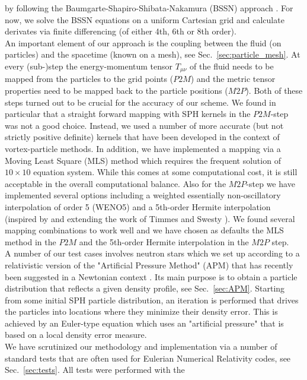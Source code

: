 \documentclass[useAMS,usenatbib]{iopart}
\begin{document}
by following the Baumgarte-Shapiro-Shibata-Nakamura (BSSN) approach  \cite{nakamura87,shibata95,baumgarte99}. 
For now, we solve the BSSN equations on a uniform Cartesian grid and calculate derivates 
via finite differencing (of either 4th, 6th or 8th order). \\
An important element of our approach is the coupling between the fluid (on particles) and
the spacetime (known on a mesh), see Sec.~\ref{sec:particle_mesh}. At every (sub-)step the energy-momentum tensor
$T_{\mu\nu}$ of the fluid needs to be mapped from the particles to the grid points ($P2M$) 
and the  metric tensor properties need to be mapped back to the particle positions ($M2P$). 
Both of these steps turned out to be crucial for the accuracy of our scheme. We found in 
particular that a straight forward mapping with SPH kernels in the $P2M$-step was not a 
good choice. Instead, we used a number of more accurate (but not strictly positive definite)
kernels that have been developed in the context of vortex-particle methods. In addition, we have implemented
a mapping via a Moving Least Square (MLS) method which requires the frequent solution of 
$10\times10$ equation system. While this comes at some computational cost, it is
still acceptable in the overall computational balance.
Also for the $M2P$-step we have implemented several options including a
weighted essentially non-oscillatory interpolation of order 5 (WENO5) and a
5th-order Hermite interpolation (inspired by and extending the work of Timmes and Swesty \cite{timmes00a}).
We found several mapping combinations to work well and we have chosen as defaults
the MLS method in the $P2M$ and the 5th-order Hermite interpolation in the $M2P$ step.\\
A number of our test cases involves neutron stars which we set up 
according to a relativistic version of the "Artificial Pressure Method" (APM) that has recently been suggested in
a Newtonian context \cite{rosswog20a}. Its main purpose is to obtain a particle distribution
that reflects a given density profile, see Sec.~\ref{sec:APM}. Starting from some initial SPH particle 
distribution, an iteration is performed that drives the particles into
locations where they minimize their density error. This is achieved by  an Euler-type
equation which uses an "artificial pressure" that is based on a local density error measure.\\
We have scrutinized our methodology and implementation via a number of standard tests
that are often used for Eulerian Numerical Relativity codes, see Sec.~\ref{sec:tests}. All tests were performed with the
\end{document}

